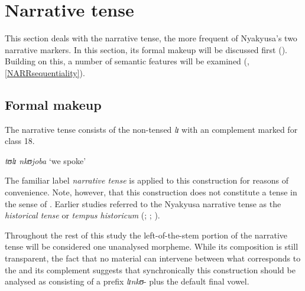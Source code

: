 \section{Narrative tense}\label{NarrativeTense}
This section deals with the narrative tense, the more frequent of Nyakyusa's two narrative markers. In this section, its formal makeup will be discussed first (). Building on this, a number of semantic features will be examined (, \ref{NARRsequentiality}).
\subsection{Formal makeup}
\label{sectionNarrativeTenseFormalAspects}
The narrative tense consists of the non-tensed  \textit{lɪ} with an  complement marked for  class 18.

\begin{exe}
\ex \textit{tʊlɪ nkʊjoba} \lq we spoke'
\end{exe}
The familiar label \textit{narrative tense} is applied to this construction for reasons of convenience. Note, however, that this construction does not constitute a tense in the sense of . Earlier studies referred to the Nyakyusa narrative tense as the \textit{historical tense} or \textit{tempus historicum} (\citealt{SchumannK1899}; \citealt{EndemannC1914}; \citealt{MwangokaNVoorhoeveJ1960}).

Throughout the rest of this study the left-of-the-stem portion of the narrative tense will be considered one unanalysed morpheme. While its composition is still transparent, the fact that no material can intervene between what corresponds to the  and its complement suggests that synchronically this construction should be analysed as consisting of a prefix \textit{lɪnkʊ}- plus the default final vowel.

\begin{exe}
\ex \begin{xlist}
\end{xlist}
\end{exe}

